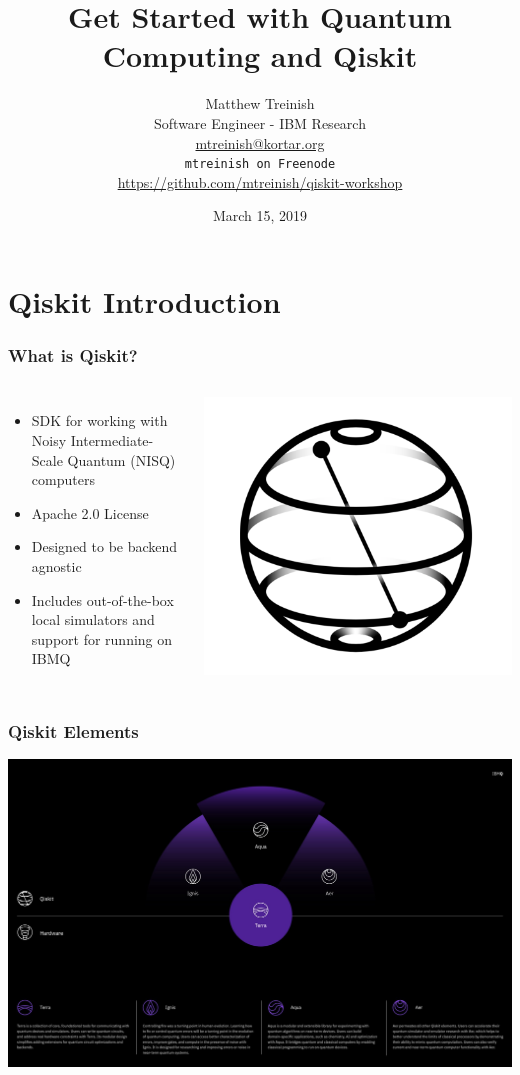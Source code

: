 \documentclass[aspectratio=169,11pt,hyperref={colorlinks=true}]{beamer}
\author[Matthew Treinish]{%
    \texorpdfstring{%
        \centering
        Matthew Treinish\\
        Software Engineer - IBM Research\\
        \href{mailto:mtreinish@kortar.org}{mtreinish@kortar.org}\\
        \texttt{mtreinish on Freenode}\\
        \href{https://github.com/mtreinish/qiskit-workshop}{https://github.com/mtreinish/qiskit-workshop}
   }
   {Matthew Treinish}
}
\date{March 15, 2019}
\title{Get Started with Quantum Computing and Qiskit}
\begin{document}
\titlepage
\section{Qiskit Introduction}
\begin{frame}
    \frametitle{What is Qiskit?}
    \begin{columns}
            \begin{itemize}
                \item SDK for working with Noisy Intermediate-Scale Quantum (NISQ) computers
                \item Apache 2.0 License
                \item Designed to be backend agnostic
                \item Includes out-of-the-box local simulators and support for running on IBMQ
            \end{itemize}
            \includegraphics[width=\textwidth]{qiskit_logo.png}
    \end{columns}
\end{frame}

\begin{frame}
    \frametitle{Qiskit Elements}
    \centering
    \includegraphics[width=.99\textwidth]{qiskit-components.jpeg}
\end{frame}
\end{document}
